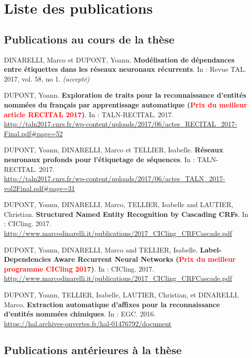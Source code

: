 \documentclass[12pt,a4paper,times,twoside,openright]{report}
\begin{document}
\chapter*{Liste des publications}
    
    \section*{Publications au cours de la thèse}
    
    DINARELLI, Marco et DUPONT, Yoann. \textbf{Modélisation de dépendances entre étiquettes dans les réseaux neuronaux récurrents}. In : Revue TAL. 2017, vol. 58, no 1. \textit{(accepté)}
    
    DUPONT, Yoann. \textbf{Exploration de traits pour la reconnaissance d'entités nommées du français par apprentissage automatique (\textcolor{red}{Prix du meilleur article RECITAL 2017})}. In : TALN-RECITAL. 2017.\\
    \url{http://taln2017.cnrs.fr/wp-content/uploads/2017/06/actes_RECITAL_2017-Final.pdf#page=52}
    
    DUPONT, Yoann, DINARELLI, Marco et TELLIER, Isabelle. \textbf{Réseaux neuronaux profonds pour l'étiquetage de séquences}. In : TALN-RECITAL. 2017.\\
    \url{http://taln2017.cnrs.fr/wp-content/uploads/2017/06/actes_TALN_2017-vol2Final.pdf#page=31}
    
    DUPONT, Yoann, DINARELLI, Marco, TELLIER, Isabelle and LAUTIER, Christian. \textbf{Structured Named Entity Recognition by Cascading CRFs}. In : CICling. 2017.\\
    \url{http://www.marcodinarelli.it/publications/2017_CICling_CRFCascade.pdf}
    
    DUPONT, Yoann, DINARELLI, Marco and TELLIER, Isabelle. \textbf{Label-Dependencies Aware Recurrent Neural Networks (\textcolor{red}{Prix du meilleur programme CICling 2017})}. In : CICling. 2017.\\
    \url{http://www.marcodinarelli.it/publications/2017_CICling_CRFCascade.pdf}
    
    DUPONT, Yoann, TELLIER, Isabelle, LAUTIER, Christian, et DINARELLI, Marco. \textbf{Extraction automatique d'affixes pour la reconnaissance d'entités nommées chimiques}. In : EGC. 2016.\\
    \url{https://hal.archives-ouvertes.fr/hal-01476792/document}
    
    
    
    \section*{Publications antérieures à la thèse}
    
\end{document}
